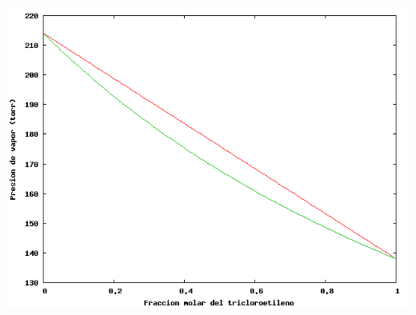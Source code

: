 \documentclass[a4paper,12pt]{article}
\begin{document}
\begin{enumerate}
\begin{center}
 \includegraphics[scale=0.8]{figure10.png}
\end{center}

\end{enumerate}
\end{document}
